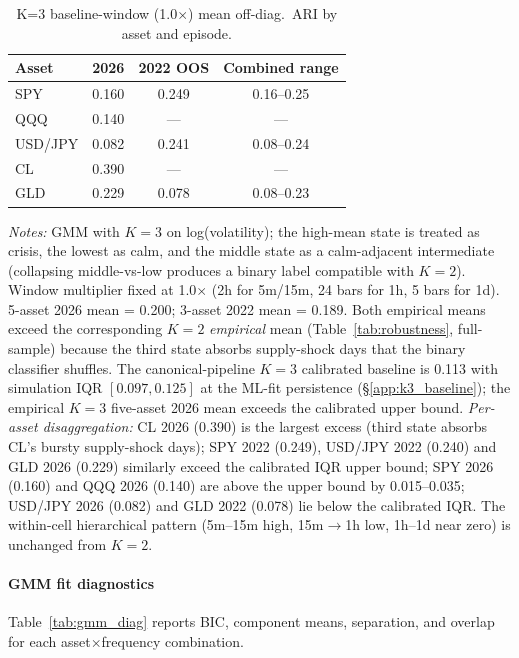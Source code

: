 \documentclass[preprint,12pt,authoryear]{elsarticle}
\begin{document}
\begin{table}[H]
\centering
\small
\setlength{\tabcolsep}{6pt}
\caption{K=3 baseline-window (1.0$\times$) mean off-diag.\ ARI by asset and episode.}
\label{tab:k3_baseline}
\begin{tabular}{lccc}
\toprule
Asset & 2026 & 2022 OOS & Combined range \\
\midrule
SPY & 0.160 & 0.249 & 0.16--0.25 \\
QQQ & 0.140 & --- & --- \\
USD/JPY & 0.082 & 0.241 & 0.08--0.24 \\
CL & 0.390 & --- & --- \\
GLD & 0.229 & 0.078 & 0.08--0.23 \\
\bottomrule
\end{tabular}
\par\medskip
{\footnotesize\justifying
\textit{Notes:} GMM with $K{=}3$ on log(volatility); the high-mean state is treated as crisis, the lowest as calm, and the middle state as a calm-adjacent intermediate (collapsing middle-vs-low produces a binary label compatible with $K{=}2$). Window multiplier fixed at 1.0$\times$ (2h for 5m/15m, 24 bars for 1h, 5 bars for 1d). 5-asset 2026 mean = 0.200; 3-asset 2022 mean = 0.189. Both empirical means exceed the corresponding $K{=}2$ \emph{empirical} mean (Table~\ref{tab:robustness}, full-sample) because the third state absorbs supply-shock days that the binary classifier shuffles. The canonical-pipeline $K{=}3$ calibrated baseline is 0.113 with simulation IQR $[0.097, 0.125]$ at the ML-fit persistence (\S\ref{app:k3_baseline}); the empirical $K{=}3$ five-asset 2026 mean exceeds the calibrated upper bound. \emph{Per-asset disaggregation:} CL 2026 (0.390) is the largest excess (third state absorbs CL's bursty supply-shock days); SPY 2022 (0.249), USD/JPY 2022 (0.240) and GLD 2026 (0.229) similarly exceed the calibrated IQR upper bound; SPY 2026 (0.160) and QQQ 2026 (0.140) are above the upper bound by 0.015--0.035; USD/JPY 2026 (0.082) and GLD 2022 (0.078) lie below the calibrated IQR. The within-cell hierarchical pattern (5m--15m high, 15m$\to$1h low, 1h--1d near zero) is unchanged from $K{=}2$.
\par}
\end{table}

\paragraph{GMM fit diagnostics}
Table~\ref{tab:gmm_diag} reports BIC, component means, separation, and overlap for each asset$\times$frequency combination.
\end{document}
